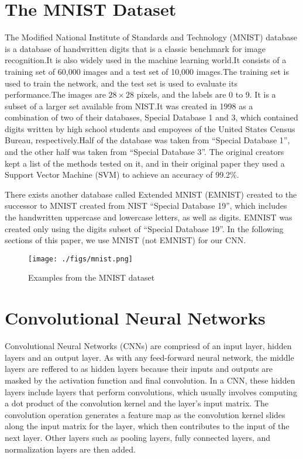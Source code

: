 \documentclass[conference]{IEEEtran}
\begin{document}
\section{The MNIST Dataset}
The Modified National Institute of Standards and Technology (MNIST) database is a database of handwritten digits \cite{6296535} that is a classic benchmark for image recognition.\@ It is also widely used in the machine learning world\cite{Platt1998}.\@ It consists of a training set of 60,000 images and a test set of 10,000 images.\@ The training set is used to train the network, and the test set is used to evaluate its performance.\@ The images are $28 \times 28$ pixels, and the labels are 0 to 9. It is a subset of a larger set available from NIST.\@ It was created in 1998 as a combination of two of their databases, Special Database 1 and 3, which contained digits written by high school students and empoyees of the United States Census Bureau, respectively.\@ Half of the database was taken from ``Special Database 1'', and the other half was taken from ``Special Database 3''. The original creators kept a list of the methods tested on it\cite{726791, mnist}, and in their original paper they used a Support Vector Machine (SVM) to achieve an accuracy of 99.2\%\cite{1265868}.
\par
There exists another database called Extended MNIST (EMNIST) created to the successor to MNIST\cite{emnist} created from NIST ``Special Database 19'', which includes the handwritten uppercase and lowercase letters, as well as digits.\cite{emnist2} EMNIST was created only using the digits subset of ``Special Database 19''. In the following sections of this paper, we use MNIST (not EMNIST) for our CNN.\@

\begin{figure}[!htp]
    \texttt{[image: ./figs/mnist.png]}
    \caption{Examples from the MNIST dataset}\label{fig:mnist}
\end{figure}

\section{Convolutional Neural Networks}\label{sec:cnn}
Convolutional Neural Networks (CNNs) are compriesd of an input layer, hidden layers and an output layer. As with any feed-forward neural network, the middle layers are reffered to as hidden layers because their inputs and outputs are masked by the activation function and final convolution. In a CNN, these hidden layers include layers that perform convolutions, which usually involves computing a dot product of the convolution kernel and the layer's input matrix. The convolution operation generates a feature map as the convolution kernel slides along the input matrix for the layer, which then contributes to the input of the next layer. Other layers such as pooling layers, fully connected layers, and normalization layers are then added.
\end{document}
